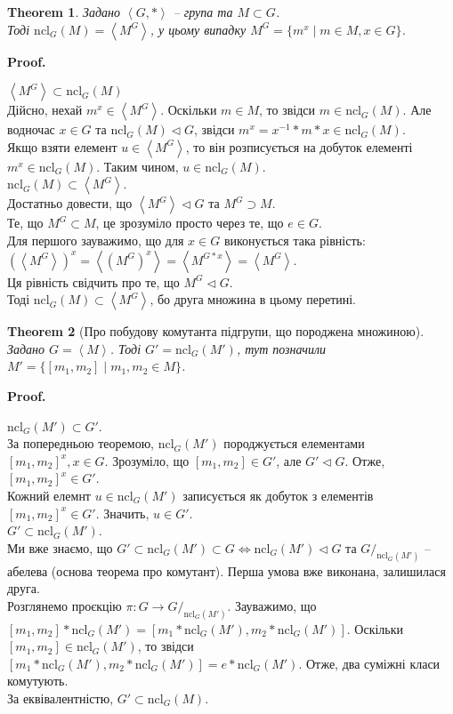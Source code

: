 \documentclass[a4paper, 10pt]{article}
\makeatletter
\theoremstyle{theoremdd}
\newtheorem{theorem}{Theorem}[subsection]
\theoremstyle{theoremdd}
\theoremstyle{theoremdd}
\theoremstyle{theoremdd}
\theoremstyle{theoremdd}
\theoremstyle{theoremdd}
\theoremstyle{theoremdd}
\theoremstyle{theoremdd}
\theoremstyle{theoremdd}
\theoremstyle{theoremdd}
\theoremstyle{theoremdd}
\theoremstyle{theoremdd}
\theoremstyle{theoremdd}
\theoremstyle{theoremdd}
\theoremstyle{theoremdd}
\renewenvironment{proof}[1][Proof.\\]{\par
\pushQED{\hfill \qed}%
\normalfont \topsep6\p@\@plus6\p@\relax
\trivlist
\item\relax
{\bfseries
#1\@addpunct{.}}\hspace\labelsep\ignorespaces
}{%
\popQED\endtrivlist\@endpefalse
}
\newcommand\ncl{\text{ncl}}
\makeatother
\begin{document}
\begin{theorem}
Задано $\left<G,*\right>$ -- група та $M \subset G$.\\
Тоді $\ncl_G(M) = \left< M^G \right>$, у цьому випадку $M^G = \{m^x \mid m \in M,x \in G\}$.
\end{theorem}

\begin{proof}
$\left<M^G \right> \subset \ncl_G(M)$\\
Дійсно, нехай $m^x \in \left<M^G\right>$. Оскільки $m \in M$, то звідси $m \in \ncl_G(M)$. Але водночас $x \in G$ та $\ncl_G(M) \triangleleft G$, звідси $m^x = x^{-1}*m*x \in \ncl_G(M)$.\\
Якщо взяти елемент $u \in \left< M^G \right>$, то він розписується на добуток елементі $m^x \in \ncl_G(M)$. Таким чином, $u \in \ncl_G(M)$.
\bigskip \\
$\ncl_G(M) \subset \left< M^G \right>$.\\
Достатньо довести, що $\left< M^G \right> \triangleleft G$ та $M^G \supset M$.\\
Те, що $M^G \subset M$, це зрозуміло просто через те, що $e \in G$.\\
Для першого зауважимо, що для $x \in G$ виконується така рівність:\\
$\left(\left< M^G \right>\right)^x = \left< (M^{G})^x \right> = \left< M^{G*x} \right> = \left< M^G \right>$.\\
Ця рівність свідчить про те, що $M^G \triangleleft G$.\\
Тоді $\ncl_G(M) \subset \left<M^G\right>$, бо друга множина в цьому перетині.
\end{proof}

\begin{theorem}[Про побудову комутанта підгрупи, що породжена множиною]
Задано $G = \left< M \right>$. Тоді $G' = \ncl_G(M')$, тут позначили \\
$M' = \{ [m_1,m_2] \mid m_1,m_2 \in M\}$.
\end{theorem}

\begin{proof}
$\ncl_G(M') \subset G'$.\\
За попередньою теоремою, $\ncl_G(M')$ породжується елементами $[m_1,m_2]^x, x \in G$. Зрозуміло, що $[m_1,m_2] \in G'$, але $G' \triangleleft G$. Отже, $[m_1,m_2]^x \in G'$.\\
Кожний елемнт $u \in \ncl_G(M')$ записується як добуток з елементів $[m_1,m_2]^x \in G'$. Значить, $u \in G'$.
\bigskip \\
$G' \subset \ncl_G(M')$.\\
Ми вже знаємо, що $G' \subset \ncl_G(M') \subset G \iff \ncl_G(M') \triangleleft G$ та $G/_{\ncl_G(M')}$ -- абелева (основа теорема про комутант). Перша умова вже виконана, залишилася друга.\\
Розглянемо проєкцію $\pi \colon G \to G/_{\ncl_G(M')}$. Зауважимо, що\\
$[m_1,m_2]*\ncl_G(M') = [m_1*\ncl_G(M'),m_2*\ncl_G(M')]$. Оскільки $[m_1,m_2] \in \ncl_G(M')$, то звідси $[m_1*\ncl_G(M'),m_2*\ncl_G(M')] = e*\ncl_G(M')$. Отже, два суміжні класи комутують.\\
За еквівалентністю, $G' \subset \ncl_G(M)$.
\end{proof}
\end{document}
